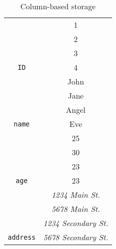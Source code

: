 \begin{table}[ht]
    \centering
    \begin{tabular}{|c|c|}
        \hline
        \cellcolor[HTML]{EFEFEF}                                   & 1                           \\ \cline{2-2}
        \cellcolor[HTML]{EFEFEF}                                   & 2                           \\ \cline{2-2}
        \cellcolor[HTML]{EFEFEF}                                   & 3                           \\ \cline{2-2}
        \multirow{-4}{*}{\cellcolor[HTML]{EFEFEF}\texttt{ID}}      & 4                           \\ \hline
        \cellcolor[HTML]{EFEFEF}                                   & John                        \\ \cline{2-2}
        \cellcolor[HTML]{EFEFEF}                                   & Jane                        \\ \cline{2-2}
        \cellcolor[HTML]{EFEFEF}                                   & Angel                       \\ \cline{2-2}
        \multirow{-4}{*}{\cellcolor[HTML]{EFEFEF}\texttt{name}}    & Eve                         \\ \hline
        \cellcolor[HTML]{EFEFEF}                                   & 25                          \\ \cline{2-2}
        \cellcolor[HTML]{EFEFEF}                                   & 30                          \\ \cline{2-2}
        \cellcolor[HTML]{EFEFEF}                                   & 23                          \\ \cline{2-2}
        \multirow{-4}{*}{\cellcolor[HTML]{EFEFEF}\texttt{age}}     & 23                          \\ \hline
        \cellcolor[HTML]{EFEFEF}                                   & \textit{1234 Main St.}      \\ \cline{2-2}
        \cellcolor[HTML]{EFEFEF}                                   & \textit{5678 Main St.}      \\ \cline{2-2}
        \cellcolor[HTML]{EFEFEF}                                   & \textit{1234 Secondary St.} \\ \cline{2-2}
        \multirow{-4}{*}{\cellcolor[HTML]{EFEFEF}\texttt{address}} & \textit{5678 Secondary St.} \\ \hline
    \end{tabular}
    \caption{Column-based storage}
\end{table}

